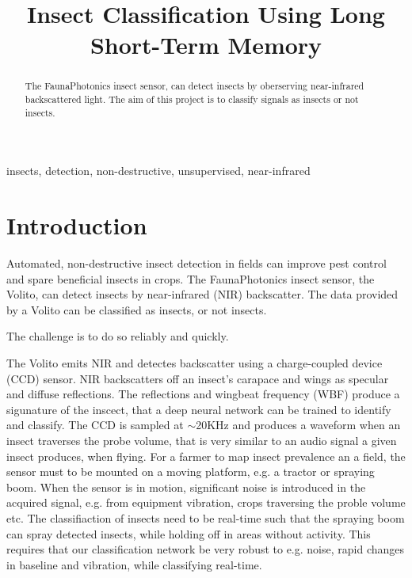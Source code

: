 \documentclass{article}
\title{Insect Classification Using Long Short-Term Memory}
\begin{document}
%

\maketitle
%
\begin{abstract}
The FaunaPhotonics insect sensor, can detect insects by oberserving near-infrared backscattered light. 
The aim of this project is to classify signals as insects or not insects.
\end{abstract}
%
\begin{keywords}
insects, detection, non-destructive, unsupervised, near-infrared
\end{keywords}
%
\section{Introduction}
\label{sec:intro}

Automated, non-destructive insect detection in fields can improve pest control and spare beneficial insects in crops\cite{Kirkeby2021}. The FaunaPhotonics insect sensor\cite{rydhmer2021automating}, the Volito, can detect insects by near-infrared (NIR) backscatter. 
The data provided by a Volito can be classified as insects, or not insects. 

The challenge is to do so reliably and quickly.

The Volito emits NIR and detectes backscatter using a charge-coupled device (CCD) sensor. NIR backscatters off an insect's carapace and wings as specular and diffuse reflections.
The reflections and wingbeat frequency (WBF) produce a sigunature of the inscect, that a deep neural network can be trained to identify and classify.
The CCD is sampled at $\sim$20KHz and produces a waveform when an insect traverses the probe volume, that is very similar to an audio signal a given insect produces, when flying. 
For a farmer to map insect prevalence an a field, the sensor must to be mounted on a moving platform, e.g. a tractor or spraying boom. When the sensor is in motion, significant noise is introduced in the acquired signal, e.g. from equipment vibration, crops traversing the proble volume etc.
The classifiaction of insects need to be real-time such that the spraying boom can spray detected insects, while holding off in areas without activity.
This requires that our classification network be very robust to e.g. noise, rapid changes in baseline and vibration, while classifying real-time.









\end{document}
